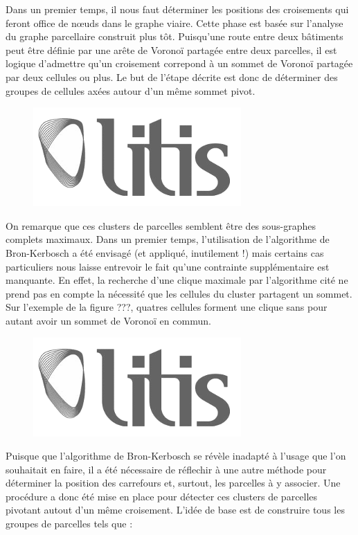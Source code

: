 \documentclass[12pt]{article}
\begin{document}
Dans un premier temps, il nous faut déterminer les positions des
croisements qui feront office de n\oe uds dans le graphe viaire. Cette
phase est basée sur l'analyse du graphe parcellaire construit plus
tôt. Puisqu'une route entre deux bâtiments peut être définie par une
arête de Voronoï partagée entre deux parcelles, il est logique
d'admettre qu'un croisement correpond à un sommet de Voronoï partagée
par deux cellules ou plus. Le but de l'étape décrite est donc de
déterminer des groupes de cellules axées autour d'un même sommet
pivot.

\begin{figure}
  \centering
  \includegraphics[width=.6\linewidth]{images/logo-litis.png}
  \caption{}
  \label{fig:construction-viaire1}
\end{figure}

On remarque que ces clusters de parcelles semblent être des
sous-graphes complets maximaux. Dans un premier temps, l'utilisation
de l'algorithme de Bron-Kerbosch a été envisagé (et appliqué,
inutilement !) mais certains cas particuliers nous laisse entrevoir
le fait qu'une contrainte supplémentaire est manquante. En effet, la
recherche d'une clique maximale par l'algorithme cité ne prend pas en
compte la nécessité que les cellules du cluster partagent un
sommet. Sur l'exemple de la figure ???, quatres cellules forment une
clique sans pour autant avoir un sommet de Voronoï en commun.

\begin{figure}
  \centering
  \includegraphics[width=.6\linewidth]{images/logo-litis.png}
  \caption{}
  \label{fig:construction-viaire2}
\end{figure}

Puisque que l'algorithme de Bron-Kerbosch se révèle inadapté à l'usage
que l'on souhaitait en faire, il a été nécessaire de réflechir à une
autre méthode pour déterminer la position des carrefours et, surtout,
les parcelles à y associer. Une procédure a donc été mise en place
pour détecter ces clusters de parcelles pivotant autout d'un même
croisement. L'idée de base est de construire tous les groupes de
parcelles tels que :
\end{document}
